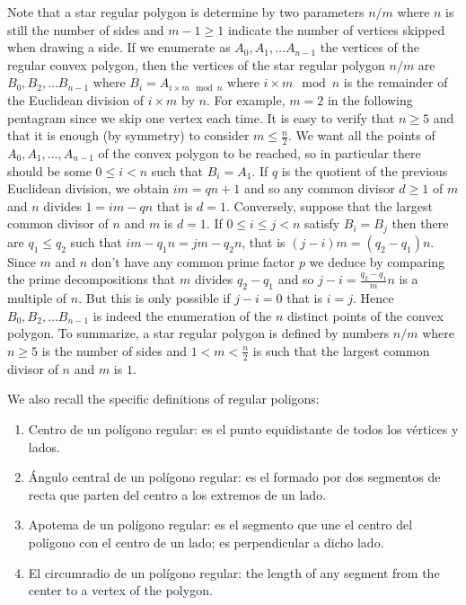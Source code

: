 Note that a star regular polygon is determine by two parameters ${n/m}$ where
$n$ is still the number of sides and $m-1 \geq 1$ indicate the number of
vertices skipped when drawing a side. If we enumerate as
$A_0, A_1, \dots A_{n-1}$
the vertices of the regular convex polygon, then the vertices
of the star regular polygon ${n/m}$ are $B_0, B_2, \dots B_{n-1}$ where
$B_{i} = A_{i \times m \mod n}$ where $i \times m \mod n$ is the remainder of the
Euclidean division of $i \times m$ by $n$.
For example, $m = 2$ in the following pentagram since we skip one vertex each
time. It is easy to verify that $n \geq 5$ and that it is enough (by symmetry)
to consider $m \leq \frac{n}{2}$.
We want all the points of $A_0, A_1, \dots, A_{n-1}$ of the convex polygon
to be reached,
so in particular there should be some $0 \leq i < n$
such that $B_i = A_1$. If $q$ is the
quotient of the previous Euclidean division, we obtain $im = q n + 1$
and so any common divisor $d \geq 1$ of $m$ and $n$ divides
$1 = im  - q n$ that is $d = 1$. Conversely, suppose that the largest common
divisor of $n$ and $m$ is $d = 1$. If $0 \leq i \leq j < n$ satisfy
$B_i = B_j$ then there are $q_1 \leq q_2$ such that
$i m - q_1 n = j m - q_2 n$, that is ${(j - i)} m = {(q_2 - q_1)} n$. Since
$m$ and $n$ don't have any common prime factor $p$ we deduce by comparing the
prime decompositions that $m$ divides $q_2 - q_1$ and so
$j - i = \frac{q_2-q_1}{m} n$ is a multiple of $n$. But this is only possible
if $j - i = 0$ that is $i = j$. Hence $B_0, B_2, \dots B_{n-1}$ is indeed
the enumeration of the $n$ distinct points of the convex polygon.
To summarize, a star regular polygon is defined by numbers ${n/m}$ where
$n \geq 5$ is the number of sides and $1 < m < \frac{n}{2}$ is such that the
largest common divisor of $n$ and $m$ is $1$.

We also recall the specific definitions of regular poligons:
\begin{enumerate}
\item Centro de un polígono regular: es el punto equidistante de todos los vértices y lados.
\item Ángulo central de un polígono regular:
  es el formado por dos segmentos de recta que parten del centro a los extremos
  de un lado.
\item Apotema de un polígono regular: es el segmento que une el centro del polígono con el centro de un lado; es perpendicular a dicho lado.
\item El circumradio de un polígono regular: the length of any segment from
  the center to a vertex of the polygon.
\end{enumerate}

